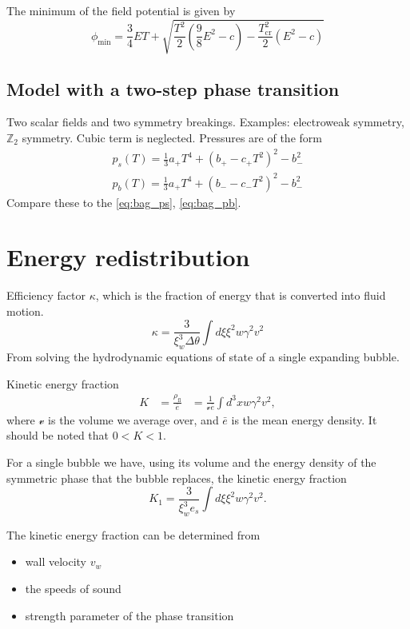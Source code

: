 The minimum of the field potential is given by
\cite[eq. 46]{giese_2020}
\begin{equation}
\phi_\text{min} = \frac{3}{4} ET + \sqrt{\frac{T^2}{2}(\frac{9}{8}E^2 - c) - \frac{T_\text{cr}^2}{2} (E^2 - c)}
\end{equation}

\subsection{Model with a two-step phase transition}
Two scalar fields and two symmetry breakings. Examples: electroweak symmetry, $\mathbb{Z}_2$ symmetry.
Cubic term is neglected.
Pressures are of the form
\cite[eq. 47-48]{giese_2020}
\begin{align}
p_s(T) = \frac{1}{3}a_+ T^4 + (b_+ - c_+ T^2)^2 - b_-^2 \\
p_b(T) = \frac{1}{3}a_+ T^4 + (b_- - c_-T^2)^2 - b_-^2
\end{align}
Compare these to the \eqref{eq:bag_ps}, \eqref{eq:bag_pb}.


\section{Energy redistribution}
Efficiency factor $\kappa$, which is the fraction of energy that is converted into fluid motion.
\begin{equation}
\kappa = \frac{3}{\xi_w^3 \Delta \theta} \int d\xi \xi^2 w \gamma^2 v^2
\end{equation}
From solving the hydrodynamic equations of state of a single expanding bubble.

Kinetic energy fraction
\cites[eq. 7.36]{lecture_notes}[eq. 5]{giese_2020}
\begin{align}
K
&= \frac{\rho_\text{fl}}{\bar{e}}
&= \frac{1}{\mathcal{v} \bar{e}} \int d^3 x w \gamma^2 v^2,
\end{align}
where $\mathcal{v}$ is the volume we average over, and $\bar{e}$ is the mean energy density.
It should be noted that $0 < K < 1$.
\cite{giese_2020}

For a single bubble we have, using its volume and the energy density of the symmetric phase that the bubble replaces, the kinetic energy fraction
\cites[eq. 7.37]{lecture_notes}[eq. 5]{giese_2020}
\begin{equation}
K_1 = \frac{3}{\xi_w^3 e_s} \int d\xi \xi^2 w \gamma^2 v^2.
\end{equation}

The kinetic energy fraction can be determined from
\begin{itemize}
\item wall velocity $v_w$
\item the speeds of sound
\item strength parameter of the phase transition
\end{itemize}


